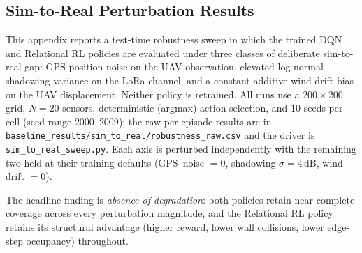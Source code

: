 \clearpage
\subsection{Sim-to-Real Perturbation Results}
\label{app:sim_to_real}

This appendix reports a test-time robustness sweep in which the trained
DQN and Relational RL policies are evaluated under three classes of
deliberate sim-to-real gap: GPS position noise on the UAV observation,
elevated log-normal shadowing variance on the LoRa channel, and a
constant additive wind-drift bias on the UAV displacement. Neither
policy is retrained. All runs use a $200\times200$ grid, $N=20$
sensors, deterministic (argmax) action selection, and $10$ seeds per
cell (seed range $2000$--$2009$); the raw per-episode results are in
\texttt{baseline\_results/sim\_to\_real/robustness\_raw.csv} and the
driver is \texttt{sim\_to\_real\_sweep.py}. Each axis is perturbed
independently with the remaining two held at their training defaults
(GPS~noise $=0$, shadowing $\sigma=4$\,dB, wind drift $=0$).

The headline finding is \emph{absence of degradation}: both policies
retain near-complete coverage across every perturbation magnitude,
and the Relational RL policy retains its structural advantage
(higher reward, lower wall collisions, lower edge-step occupancy)
throughout.

